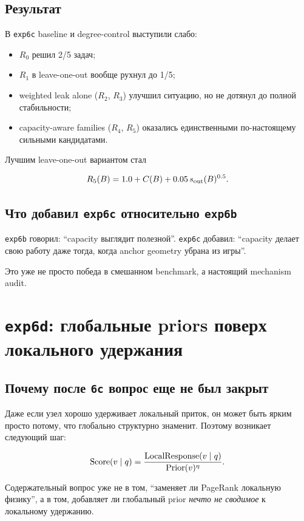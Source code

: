 \subsection{Результат}

В \texttt{exp6c} baseline и degree-control выступили слабо:

\begin{itemize}[leftmargin=2em]
\item $R_0$ решил 2/5 задач;
\item $R_1$ в leave-one-out вообще рухнул до 1/5;
\item weighted leak alone ($R_2$, $R_3$) улучшил ситуацию, но не дотянул до
полной стабильности;
\item capacity-aware families ($R_4$, $R_5$) оказались единственными по-настоящему
сильными кандидатами.
\end{itemize}

Лучшим leave-one-out вариантом стал

\[
R_5(B)=1.0+C(B)+0.05\, s_{\mathrm{out}}(B)^{0.5}.
\]

\subsection{Что добавил \texttt{exp6c} относительно \texttt{exp6b}}

\texttt{exp6b} говорил: ``capacity выглядит полезной''. \texttt{exp6c} добавил:
``capacity делает свою работу даже тогда, когда anchor geometry убрана из игры''.

Это уже не просто победа в смешанном benchmark, а настоящий mechanism audit.

\section{\texttt{exp6d}: глобальные priors поверх локального удержания}

\subsection{Почему после \texttt{6c} вопрос еще не был закрыт}

Даже если узел хорошо удерживает локальный приток, он может быть ярким просто
потому, что глобально структурно знаменит. Поэтому возникает следующий шаг:

\[
\mathrm{Score}(v\mid q)=\frac{\text{LocalResponse}(v\mid q)}{\text{Prior}(v)^\eta}.
\]

Содержательный вопрос уже не в том, ``заменяет ли PageRank локальную физику'',
а в том, добавляет ли глобальный prior \emph{нечто не сводимое} к локальному
удержанию.

